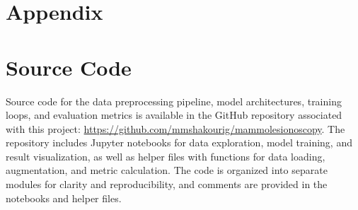 \documentclass[12pt]{article}
\begin{document}
\newpage

\appendix
\section*{Appendix}


\section{Source Code}
Source code for the data preprocessing pipeline, model architectures, training loops, and evaluation metrics is available in the GitHub repository associated with this project: \url{https://github.com/mmshakourig/mammolesionoscopy}. The repository includes Jupyter notebooks for data exploration, model training, and result visualization, as well as helper files with functions for data loading, augmentation, and metric calculation. The code is organized into separate modules for clarity and reproducibility, and comments are provided in the notebooks and helper files.
\end{document}
